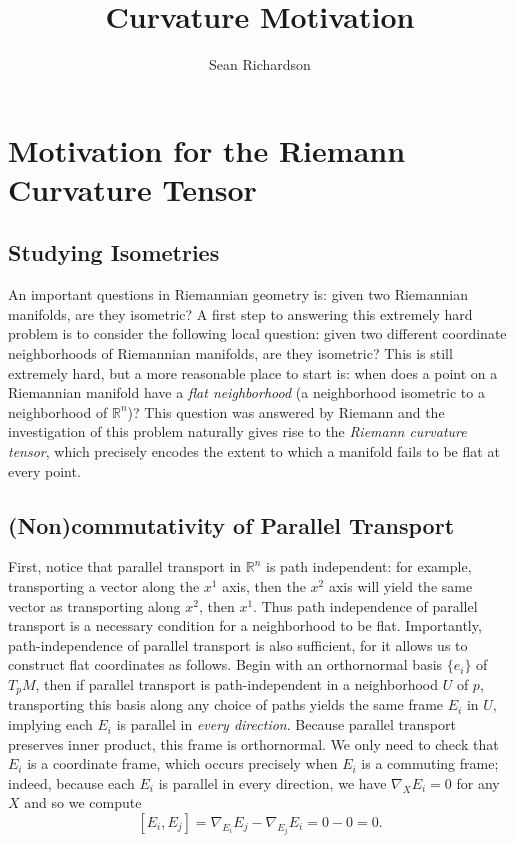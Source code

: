 \documentclass[
]{article}
\title{Curvature Motivation}
\author{Sean Richardson}
\date{}
\begin{document}
\maketitle

\hypertarget{motivation-for-the-riemann-curvature-tensor}{%
\section{Motivation for the Riemann Curvature
Tensor}\label{motivation-for-the-riemann-curvature-tensor}}

\hypertarget{studying-isometries}{%
\subsection{Studying Isometries}\label{studying-isometries}}

An important questions in Riemannian geometry is: given two Riemannian
manifolds, are they isometric? A first step to answering this extremely
hard problem is to consider the following local question: given two
different coordinate neighborhoods of Riemannian manifolds, are they
isometric? This is still extremely hard, but a more reasonable place to
start is: when does a point on a Riemannian manifold have a \emph{flat
neighborhood} (a neighborhood isometric to a neighborhood of
\(\mathbb{R}^n\))? This question was answered by Riemann and the
investigation of this problem naturally gives rise to the \emph{Riemann
curvature tensor}, which precisely encodes the extent to which a
manifold fails to be flat at every point.

\hypertarget{noncommutativity-of-parallel-transport}{%
\subsection{(Non)commutativity of Parallel
Transport}\label{noncommutativity-of-parallel-transport}}

First, notice that parallel transport in \(\mathbb{R}^n\) is path
independent: for example, transporting a vector along the \(x^1\) axis,
then the \(x^2\) axis will yield the same vector as transporting along
\(x^2\), then \(x^1\). Thus path independence of parallel transport is a
necessary condition for a neighborhood to be flat. Importantly,
path-independence of parallel transport is also sufficient, for it
allows us to construct flat coordinates as follows. Begin with an
orthornormal basis \(\{e_i\}\) of \(T_pM\), then if parallel transport
is path-independent in a neighborhood \(U\) of \(p\), transporting this
basis along any choice of paths yields the same frame \(E_i\) in \(U\),
implying each \(E_i\) is parallel in \emph{every direction}. Because
parallel transport preserves inner product, this frame is orthornormal.
We only need to check that \(E_i\) is a coordinate frame, which occurs
precisely when \(E_i\) is a commuting frame; indeed, because each
\(E_i\) is parallel in every direction, we have \(\nabla_X E_i = 0\) for
any \(X\) and so we compute \[
    [E_i, E_j] = \nabla_{E_i}E_j - \nabla_{E_j}E_i = 0 - 0 = 0.
\]
\end{document}
